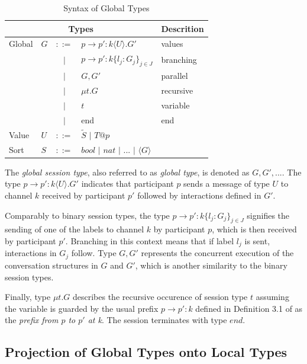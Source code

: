 \begin{table}[H]
\center
\caption{Syntax of Global Types}
\begin{tabular}{|l|l c l|l|}
  \hline  
  \multicolumn{4}{|c|}{Types} 																	&	Descrition \\
  \hline  
  Global &	$G$ &	$::=$	& $p \rightarrow p' : k \langle U \rangle . G'$ 					& 	values	 	\\
  		 &		&	$|$		& $p \rightarrow p' : k \lbrace l_{j}:G_{j} \rbrace _{j \in J} $ 	& 	branching 	\\
  		 &		&	$|$		& $G,G' $ 															& 	parallel 	\\
  		 &		&	$|$		& $\mu t.G $ 														& 	recursive 	\\
  		 &		&	$|$		& $t$ 																& 	variable 	\\
  		 &		&	$|$		& end																& 	end		 	\\
  Value	 &	$U$ &	$::=$	& $\tilde{S}$ $|$ $T@p$							 					& 			 	\\
  Sort	 &	$S$ &	$::=$	& $bool$ $|$ $nat$ $|$ ${...}$ $|$ $\langle G \rangle$				& 			 	\\	  
  \hline
\end{tabular}
\label{TBglobtypesynt}
\end{table}

The \textit{global session type}, also referred to as \textit{global type}, is denoted as $G,G',...$. The type  $p \rightarrow p' : k \langle U \rangle . G'$ indicates that participant $p$ sends a message of type $U$ to channel $k$ received by participant $p'$ followed by interactions defined in $G'$. 

Comparably to binary session types, the type $p \rightarrow p' : k \lbrace l_{j}:G_{j} \rbrace _{j \in J} $ signifies the sending of one of the labels to channel $k$ by participant $p$, which is then received by participant $p'$. Branching in this context means that if label $l_{j}$ is sent, interactions in $G_{j}$ follow.
Type $G, G'$ represents the concurrent execution of the conversation structures in $G$ and $G'$, which is another similarity to the binary session types.

Finally, type $\mu t.G $ describes the recursive occurence of session type $t$ assuming the variable is guarded by the usual prefix $p \rightarrow p' : k $ defined in Definition 3.1 of \cite{multiparty_sess_types} as the \textit{prefix from $p$ to $p'$ at k}. The session terminates with type $end$.

\subsection{Projection of Global Types onto Local Types}


